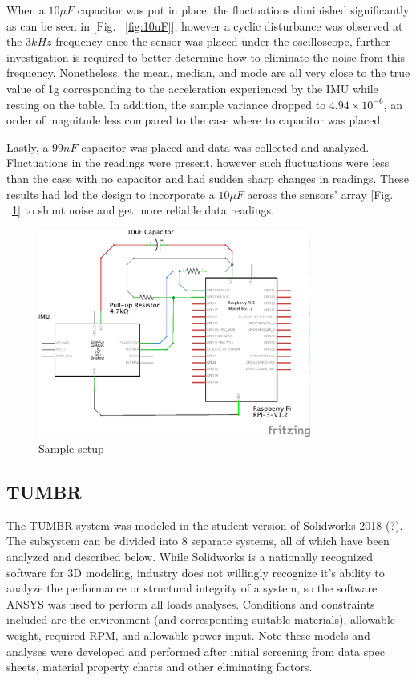When a $10\mu F$ capacitor was put in place, the fluctuations diminished significantly as can be seen in [Fig. ~\ref{fig:10uF}], however a cyclic disturbance was observed at the $3kHz$ frequency once the sensor was placed under the oscilloscope, further investigation is required to better determine how to eliminate the noise from this frequency. Nonetheless, the mean, median, and mode are all very close to the true value of 1g corresponding to the acceleration experienced by the IMU while resting on the table. In addition, the sample variance dropped to $4.94\times10^{\minus6}$, an order of magnitude less compared to the case where to capacitor was placed.

Lastly, a $99nF$ capacitor was placed and data was collected and analyzed. Fluctuations in the readings were present, however such fluctuations were less than the case with no capacitor and had sudden sharp changes in readings. These results had led the design to incorporate a $10\mu F$ across the sensors' array [Fig. ~\ref{fig:rpi_imu_setup}] to shunt noise and get more reliable data readings.

\begin{figure}[ht]
  \centering
  \includegraphics[width=0.8\textwidth]{Controls/rpi_imu_setup_schem.png}
  \caption{\label{fig:rpi_imu_setup} Sample setup }
\end{figure}


\subsection{TUMBR}

\indent\indent The TUMBR system was modeled in the student version of Solidworks 2018 (?). The subsystem can be divided into 8 separate systems, all of which have been analyzed and described below. While Solidworks is a nationally recognized software for 3D modeling, industry does not willingly recognize it's ability to analyze the performance or structural integrity of a system, so the software ANSYS was used to perform all loads analyses. Conditions and constraints included are the environment (and corresponding suitable materials), allowable weight, required RPM, and allowable power input. Note these models and analyses were developed and performed after initial screening from data spec sheets, material property charts and other eliminating factors.

